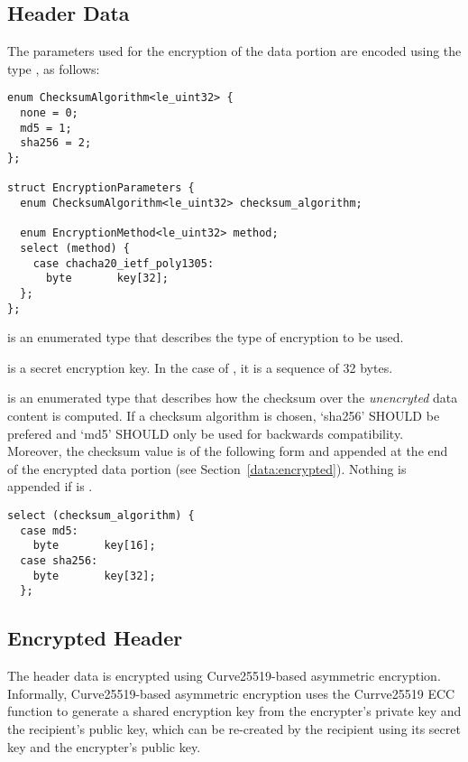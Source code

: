 \subsection{Header Data}\label{header:data}

The parameters used for the encryption of the data portion are encoded using the type , as follows:

\begin{verbatim}
enum ChecksumAlgorithm<le_uint32> {
  none = 0;
  md5 = 1;
  sha256 = 2;
};

struct EncryptionParameters {
  enum ChecksumAlgorithm<le_uint32> checksum_algorithm;

  enum EncryptionMethod<le_uint32> method;
  select (method) {
    case chacha20_ietf_poly1305:
      byte       key[32];
  };
};
\end{verbatim}

 is an enumerated type that describes the type of encryption to be used.

 is a secret encryption key.
%
In the case of , it is a sequence of 32 bytes.

 is an enumerated type that describes how the checksum over the \emph{unencryted} data content is computed.
%
If a checksum algorithm is chosen, `sha256' SHOULD be prefered and `md5' SHOULD only be used for backwards compatibility.
%
Moreover, the checksum value is of the following form and appended at the end of the encrypted data portion (see Section~\ref{data:encrypted}). Nothing is appended if  is .
%
\begin{verbatim}
select (checksum_algorithm) {
  case md5:
    byte       key[16];
  case sha256:
    byte       key[32];
  };
\end{verbatim}

\subsection{Encrypted Header}\label{header:encrypted}

The header data is encrypted using Curve25519-based asymmetric encryption.
%
Informally, Curve25519-based asymmetric encryption uses the Currve25519 ECC function to generate a shared encryption key from the encrypter's private key and the recipient's public key, which can be re-created by the recipient using its secret key and the encrypter's public key.
%

